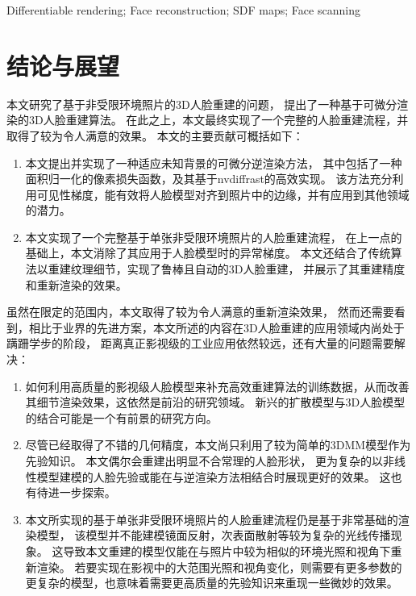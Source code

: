 \documentclass{scutmaster}
\begin{document}
 Differentiable rendering; Face reconstruction; SDF maps; Face scanning

\tableofcontents

\listoffigures

\listoftables

\mainmatter








{
\backmatter
\chapter{结论与展望}
\label{chap:conclusion}

本文研究了基于非受限环境照片的3D人脸重建的问题，
提出了一种基于可微分渲染的3D人脸重建算法。
在此之上，本文最终实现了一个完整的人脸重建流程，并取得了较为令人满意的效果。
本文的主要贡献可概括如下：
\begin{enumerate}
\item 本文提出并实现了一种适应未知背景的可微分逆渲染方法，
其中包括了一种面积归一化的像素损失函数，及其基于nvdiffrast的高效实现。
该方法充分利用可见性梯度，能有效将人脸模型对齐到照片中的边缘，并有应用到其他领域的潜力。
\item 本文实现了一个完整基于单张非受限环境照片的人脸重建流程，
在上一点的基础上，本文消除了其应用于人脸模型时的异常梯度。
本文还结合了传统算法以重建纹理细节，实现了鲁棒且自动的3D人脸重建，
并展示了其重建精度和重新渲染的效果。
\end{enumerate}

虽然在限定的范围内，本文取得了较为令人满意的重新渲染效果，
然而还需要看到，相比于业界的先进方案，本文所述的内容在3D人脸重建的应用领域内尚处于蹒跚学步的阶段，
距离真正影视级的工业应用依然较远，还有大量的问题需要解决：
\begin{enumerate}
\item 如何利用高质量的影视级人脸模型来补充高效重建算法的训练数据，从而改善其细节渲染效果，这依然是前沿的研究领域。
新兴的扩散模型与3D人脸模型的结合可能是一个有前景的研究方向。
\item 尽管已经取得了不错的几何精度，本文尚只利用了较为简单的3DMM模型作为先验知识。
本文偶尔会重建出明显不合常理的人脸形状，
更为复杂的以非线性模型建模的人脸先验或能在与逆渲染方法相结合时展现更好的效果。
这也有待进一步探索。
\item 本文所实现的基于单张非受限环境照片的人脸重建流程仍是基于非常基础的渲染模型，
该模型并不能建模镜面反射，次表面散射等较为复杂的光线传播现象。
这导致本文重建的模型仅能在与照片中较为相似的环境光照和视角下重新渲染。
若要实现在影视中的大范围光照和视角变化，则需要有更多参数的更复杂的模型，也意味着需要更高质量的先验知识来重现一些微妙的效果。
\end{enumerate}

}
\end{document}

